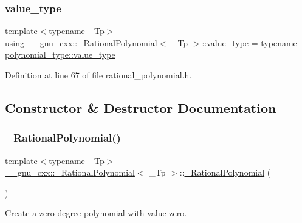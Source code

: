 \subsubsection{\texorpdfstring{value\+\_\+type}{value\_type}}
{\footnotesize\ttfamily template$<$typename \+\_\+\+Tp$>$ \\
using \hyperlink{class____gnu__cxx_1_1__RationalPolynomial}{\+\_\+\+\_\+gnu\+\_\+cxx\+::\+\_\+\+Rational\+Polynomial}$<$ \+\_\+\+Tp $>$\+::\hyperlink{class____gnu__cxx_1_1__RationalPolynomial_adeec7f1bec03111031599f337848ee8b}{value\+\_\+type} =  typename \hyperlink{class____gnu__cxx_1_1__Polynomial_a725563351f50e76084a7a016c06f8a53}{polynomial\+\_\+type\+::value\+\_\+type}}



Definition at line 67 of file rational\+\_\+polynomial.\+h.



\subsection{Constructor \& Destructor Documentation}
\mbox{\label{class____gnu__cxx_1_1__RationalPolynomial_a35b2504272a73aa54b48310004c46fd1}} 
\subsubsection{\texorpdfstring{\+\_\+\+Rational\+Polynomial()}{\_RationalPolynomial()}\hspace{0.1cm}{\footnotesize\ttfamily [1/5]}}
{\footnotesize\ttfamily template$<$typename \+\_\+\+Tp$>$ \\
\hyperlink{class____gnu__cxx_1_1__RationalPolynomial}{\+\_\+\+\_\+gnu\+\_\+cxx\+::\+\_\+\+Rational\+Polynomial}$<$ \+\_\+\+Tp $>$\+::\hyperlink{class____gnu__cxx_1_1__RationalPolynomial}{\+\_\+\+Rational\+Polynomial} (\begin{DoxyParamCaption}{ }\end{DoxyParamCaption})\hspace{0.3cm}{\ttfamily [inline]}}

Create a zero degree polynomial with value zero. 

